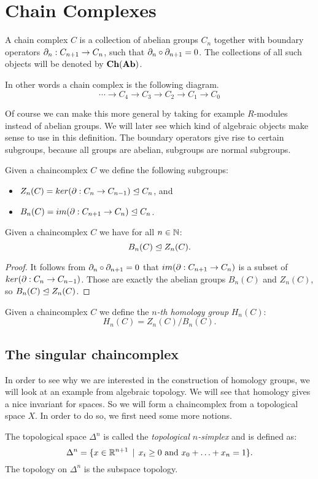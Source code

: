 \section{Chain Complexes}
\label{sec:Chain Complexes}
\begin{definition}
	A chain complex $C$ is a collection of abelian groups $C_n$ together with boundary operators $\partial_n: C_{n+1} \to C_n$, such that $\partial_n \circ \partial_{n+1} = 0$. The collections of all such objects will be denoted by $\mathbf{Ch}(\mathbf{Ab})$.
\end{definition}

In other words a chain complex is the following diagram.
$$ \cdots \to C_4 \to C_3 \to C_2 \to C_1 \to C_0 $$

Of course we can make this more general by taking for example $R$-modules instead of abelian groups. We will later see which kind of algebraic objects make sense to use in this definition. The boundary operators give rise to certain subgroups, because all groups are abelian, subgroups are normal subgroups.

\begin{definition}
	Given a chaincomplex $C$ we define the following subgroups:
	\begin{itemize}
		\item $Z_n(C) = ker(\partial: C_n \to C_{n-1}) \trianglelefteq C_n$, and
		\item $B_n(C) = im(\partial: C_{n+1} \to C_n) \trianglelefteq C_n$.
	\end{itemize}
\end{definition}
\begin{lemma}
	Given a chaincomplex $C$ we have for all $n \in \mathbb{N}$:
	$$ B_n(C) \trianglelefteq Z_n(C).$$
\end{lemma}
\begin{proof}
	It follows from $\partial_n \circ \partial_{n+1} = 0$ that $im(\partial: C_{n+1} \to C_n)$ is a subset of $ker(\partial: C_n \to C_{n-1})$. Those are exactly the abelian groups $B_n(C)$ and $Z_n(C)$, so $ B_n(C) \trianglelefteq Z_n(C) $.
\end{proof}
\begin{definition}
	Given a chaincomplex $C$ we define the \emph{$n$-th homology group} $H_n(C)$:
	$$ H_n(C) = Z_n(C) / B_n(C).$$
\end{definition}

\subsection{The singular chaincomplex}
In order to see why we are interested in the construction of homology groups, we will look at an example from algebraic topology. We will see that homology gives a nice invariant for spaces. So we will form a chaincomplex from a topological space $X$. In order to do so, we first need some more notions.
\begin{definition}
	The topological space $\Delta^n$ is called the \emph{topological $n$-simplex} and is defined as:
	$$ \Delta^n = \{x \in \mathbb{R}^{n+1} \,\mid\, x_i \geq 0 \text{ and } x_0 + \ldots + x_n = 1 \}.$$
	The topology on $\Delta^n$ is the subspace topology.
\end{definition}

